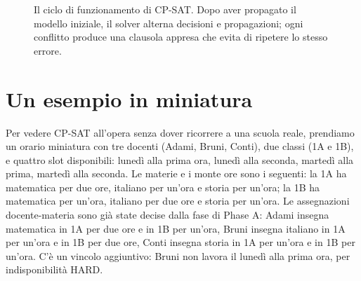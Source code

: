 \begin{figure}[h]
\centering
{}
\caption{Il ciclo di funzionamento di CP-SAT. Dopo aver
propagato il modello iniziale, il solver alterna decisioni
e propagazioni; ogni conflitto produce una clausola appresa
che evita di ripetere lo stesso errore.}
\label{fig:cpsat-cycle}
\end{figure}

\section{Un esempio in miniatura}

Per vedere CP-SAT all'opera senza dover ricorrere a una
scuola reale, prendiamo un orario miniatura con tre docenti
(Adami, Bruni, Conti), due classi (1A e 1B), e quattro slot
disponibili: luned\`i alla prima ora, luned\`i alla seconda,
marted\`i alla prima, marted\`i alla seconda. Le materie e i
monte ore sono i seguenti: la 1A ha matematica per due ore,
italiano per un'ora e storia per un'ora; la 1B ha
matematica per un'ora, italiano per due ore e storia per
un'ora. Le assegnazioni docente-materia sono gi\`a state
decise dalla fase di Phase A: Adami insegna matematica in 1A
per due ore e in 1B per un'ora, Bruni insegna italiano in 1A
per un'ora e in 1B per due ore, Conti insegna storia in 1A
per un'ora e in 1B per un'ora. C'\`e un vincolo aggiuntivo:
Bruni non lavora il luned\`i alla prima ora, per
indisponibilit\`a HARD.

